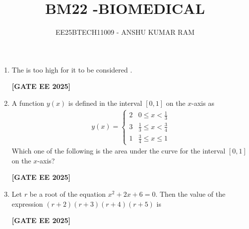 \documentclass[journal]{IEEEtran}
\newcommand{\qfooter}{%
  \begin{flushright}\footnotesize\textbf{[GATE EE 2025]}\end{flushright}\vspace{1em}%
}
\begin{document}

\vspace{3cm}
\title{BM22 -BIOMEDICAL}
\author{EE25BTECH11009 - ANSHU KUMAR RAM}
{\let\newpage\relax\maketitle}

\begin{enumerate}

\item The \underline{\hspace{2cm}} is too high for it to be considered \underline{\hspace{2cm}}.
\begin{enumerate}
\qfooter
\end{enumerate}

\item A function $y(x)$ is defined in the interval $[0, 1]$ on the $x$-axis as
\begin{align}
y(x) = 
\begin{cases}
2 & 0 \leq x < \frac{1}{3} \\
3 & \frac{1}{3} \leq x < \frac{3}{4} \\
1 & \frac{3}{4} \leq x \leq 1
\end{cases}
\end{align}
Which one of the following is the area under the curve for the interval $[0, 1]$ on the $x$-axis?
\begin{enumerate}
\qfooter
\end{enumerate}

\item Let $r$ be a root of the equation $x^2 + 2x + 6 = 0$. Then the value of the expression $(r+2)(r+3)(r+4)(r+5)$ is
\begin{enumerate}
\qfooter
\end{enumerate}


\end{enumerate}
\end{document}
